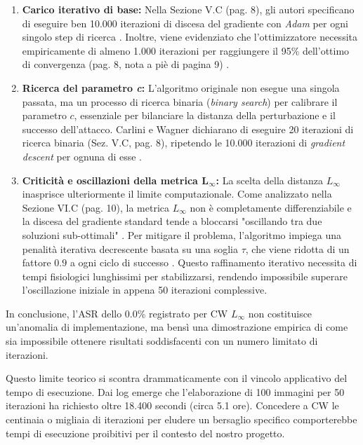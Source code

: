 \documentclass[a4paper, 12pt]{article}
\begin{document}
\begin{enumerate}
    \item \textbf{Carico iterativo di base:} Nella Sezione V.C (pag. 8), gli autori specificano di eseguire ben 10.000 iterazioni di discesa del gradiente con \textit{Adam} per ogni singolo step di ricerca \cite{carlini2017towards}. Inoltre, viene evidenziato che l'ottimizzatore necessita empiricamente di almeno 1.000 iterazioni per raggiungere il 95\% dell'ottimo di convergenza (pag. 8, nota a piè di pagina 9) \cite{carlini2017towards}.
    
    \item \textbf{Ricerca del parametro \textit{c}:} L'algoritmo originale non esegue una singola passata, ma un processo di ricerca binaria (\textit{binary search}) per calibrare il parametro $c$, essenziale per bilanciare la distanza della perturbazione e il successo dell'attacco. Carlini e Wagner dichiarano di eseguire 20 iterazioni di ricerca binaria (Sez. V.C, pag. 8), ripetendo le 10.000 iterazioni di \textit{gradient descent} per ognuna di esse \cite{carlini2017towards}.
    
    \item \textbf{Criticità e oscillazioni della metrica $\boldsymbol{L_{\infty}}$:} La scelta della distanza $L_{\infty}$ inasprisce ulteriormente il limite computazionale. Come analizzato nella Sezione VI.C (pag. 10), la metrica $L_{\infty}$ non è completamente differenziabile e la discesa del gradiente standard tende a bloccarsi "oscillando tra due soluzioni sub-ottimali" \cite{carlini2017towards}. Per mitigare il problema, l'algoritmo impiega una penalità iterativa decrescente basata su una soglia $\tau$, che viene ridotta di un fattore $0.9$ a ogni ciclo di successo \cite{carlini2017towards}. Questo raffinamento iterativo necessita di tempi fisiologici lunghissimi per stabilizzarsi, rendendo impossibile superare l'oscillazione iniziale in appena 50 iterazioni complessive.
\end{enumerate}

In conclusione, l'ASR dello 0.0\% registrato per CW $L_{\infty}$ non costituisce un'anomalia di implementazione, ma bensì una dimostrazione empirica di come sia impossibile ottenere risultati soddisfacenti con un numero limitato di iterazioni.

Questo limite teorico si scontra drammaticamente con il vincolo applicativo del tempo di esecuzione. Dai log emerge che l'elaborazione di 100 immagini per 50 iterazioni ha richiesto oltre 18.400 secondi (circa 5.1 ore). Concedere a CW le centinaia o migliaia di iterazioni per eludere un bersaglio specifico comporterebbe tempi di esecuzione proibitivi per il contesto del nostro progetto.
\end{document}
